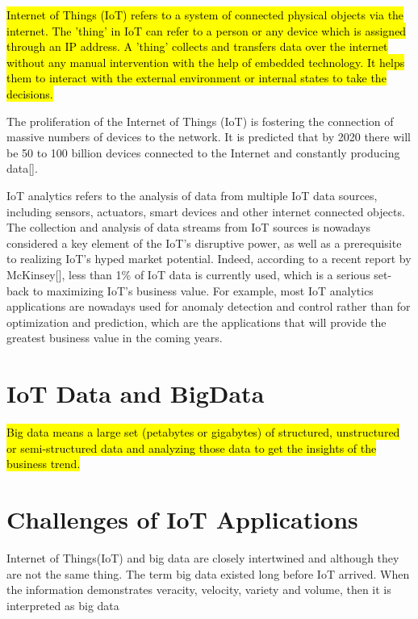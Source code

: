 \hl{Internet of Things (IoT) refers to a system of connected physical objects via the internet. The 'thing' in IoT can refer to a person or any device which is assigned through an IP address. A 'thing' collects and transfers data over the internet without any manual intervention with the help of embedded technology. It helps them to interact with the external environment or internal states to take the decisions.}

The proliferation of the Internet of Things (IoT) is fostering the connection of massive numbers of devices to the network. It is predicted that by 2020 there will be 50 to 100 billion devices connected to the Internet and constantly producing data[].

IoT analytics refers to the analysis of data from multiple IoT data sources, including sensors, actuators, smart devices and other internet connected objects. The collection and analysis of data streams from IoT sources is nowadays considered a key element of the IoT’s disruptive power, as well as a prerequisite to realizing IoT’s hyped market potential. Indeed, according to a recent report by McKinsey[], less than 1\% of IoT data is currently used, which is a serious set-back to maximizing IoT’s business value. For example, most IoT analytics applications are nowadays used for anomaly detection and control rather than for optimization and prediction, which are the applications that will provide the greatest business value in the coming years.

\section{IoT Data and BigData}

\hl{Big data means a large set (petabytes or gigabytes) of structured, unstructured or semi-structured data and analyzing those data to get the insights of the business trend.}


\section{Challenges of IoT Applications}

Internet of Things(IoT) and big data are closely intertwined and although they are not the same thing.
The term big data existed long before IoT arrived. When the information demonstrates veracity, velocity, variety and volume, then it is interpreted as big data

